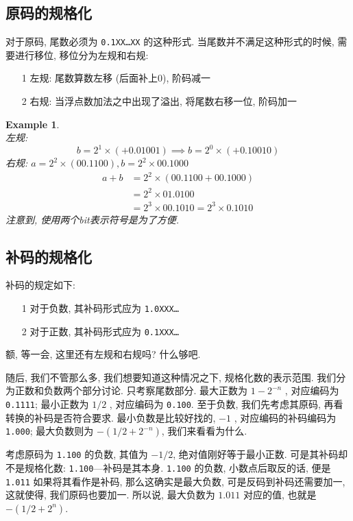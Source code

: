 \documentclass[12pt]{ctexart}
\theoremstyle{definition}
\theoremstyle{plain}
\newtheorem{exam}[definition]{Example}
\begin{document}
\subsection{原码的规格化}
对于原码, 尾数必须为 \texttt{0.1XX\dots XX} 的这种形式. 当尾数并不满足这种形式的时候, 需要进行移位, 移位分为左规和右规:
\begin{itemize}
\item [1] 左规: 尾数算数左移 (后面补上0), 阶码减一
\item [2] 右规: 当浮点数加法之中出现了溢出, 将尾数右移一位, 阶码加一
\end{itemize}

\begin{exam}\quad\\ 
左规:
\[
b = 2 ^{1} \times (+ 0.01001) \implies b = 2 ^{0} \times (+ 0.1 0010)
\]
右规: \(a = 2^{2} \times (00.1100) , b = 2^{2	} \times 00.1000\)
\[
\begin{aligned}
a + b & = 2 ^{2} \times ( 00. 1100 + 00.1000) \\ 
& =  2^{2} \times 01.0100 \\ 
&  = 2 ^{3} \times 00.1010 = 2 ^{3} \times 0.1010
\end{aligned}
\]
注意到, 使用两个bit表示符号是为了方便. 
\end{exam}

\subsection{补码的规格化}
补码的规定如下:
\begin{itemize}
\item [1] 对于负数, 其补码形式应为 \texttt{1.0XXX\dots} 
\item [2] 对于正数, 其补码形式应为 \texttt{0.1XXX\dots}
\end{itemize}

额, 等一会, 这里还有左规和右规吗? 什么够吧. 

随后, 我们不管那么多, 我们想要知道这种情况之下, 规格化数的表示范围. 我们分为正数和负数两个部分讨论. 只考察尾数部分. 
最大正数为 \(1 - 2 ^{-n}\) , 对应编码为 \texttt{0.1111}; 最小正数为 \(1/2\) , 对应编码为 \texttt{0.100}. 至于负数, 我们先考虑其原码, 再看转换的补码是否符合要求. 最小负数是比较好找的, \(-1\) , 对应编码的补码编码为 \texttt{1.000}; 最大负数则为 \(- (1/2 + 2 ^{-n})\), 我们来看看为什么. 

考虑原码为 \texttt{1.100} 的负数, 其值为 \(-1/2\), 绝对值刚好等于最小正数. 可是其补码却不是规格化数: \texttt{1.100}---补码是其本身. \texttt{1.100} 的负数, 小数点后取反的话, 便是 \texttt{1.011} 如果将其看作是补码, 那么这确实是最大负数, 可是反码到补码还需要加一, 这就使得, 我们原码也要加一. 所以说, 最大负数为 \(1.011\) 对应的值, 也就是 \(-(1/2 + 2^{n})\). 
\end{document}
